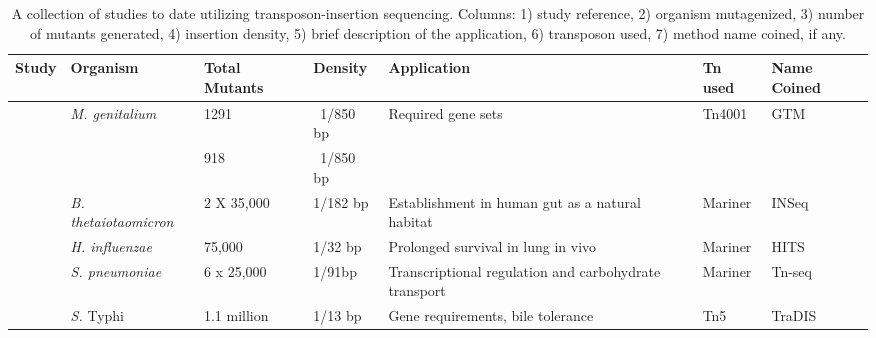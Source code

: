 %
\begingroup
\begin{landscape}
   \tiny
   \noindent
    \begin{longtable}{ l
    				l
				l
				l
				p{2in}
				l
				l}
    \caption[Summary of transposon-insertion sequencing studies to date]{A collection of studies to date utilizing transposon-insertion sequencing. Columns: 1) study reference,  2) organism mutagenized, 3) number of mutants generated, 4) insertion density, 5) brief description of the application, 6) transposon used, 7) method name coined, if any.}
    \\
    \toprule
    \textbf{Study} & \textbf{Organism} & \textbf{Total Mutants} & \textbf{Density} & \textbf{Application} & \textbf{Tn used } & \textbf{Name Coined} \\
    \midrule
    \multirow{2}[1]{*}{\textcite{Hutchison1999}}  & \multirow{2}[1]{*}{\textit{M. genitalium}} & 1291  &  ~1/850 bp & \multirow{2}[1]{2in}{Required gene sets} & \multirow{2}[1]{*}{Tn4001} & \multirow{2}[1]{*}{GTM\nomenclature{GTM}{Global transposon mutagenesis} } \\
          &  \textit{M. pneumoniae}     & 918   & ~1/850 bp &       &       &  \\
    \multirow{2}[0]{*}{\textcite{Goodman2009}} & \multirow{2}[0]{*}{\textit{B. thetaiotaomicron}} & \multirow{2}[0]{*}{2 X 35,000} & \multirow{2}[0]{*}{1/182 bp} & \multirow{2}[0]{2in}{Establishment in human gut as a natural habitat} & \multirow{2}[0]{*}{Mariner} & \multirow{2}[0]{*}{INSeq} \\
          &       &       &       &       &       &  \\
    \multirow{2}[0]{*}{\textcite{Gawronski2009} } & \multirow{2}[0]{*}{\textit{H. influenzae}} & \multirow{2}[0]{*}{75,000} & \multirow{2}[0]{*}{1/32 bp} & \multirow{2}[0]{2in}{Prolonged survival in lung in vivo} & \multirow{2}[0]{*}{Mariner} & \multirow{2}[0]{*}{ HITS} \\
          &       &       &       &       &       &  \\
   \textcite{Opijnen2009}  & \textit{S. pneumoniae} & 6 x 25,000 & 1/91bp & Transcriptional regulation and carbohydrate transport & Mariner & Tn-seq \\
    \multirow{2}[0]{*}{\textcite{Langridge2009a}}  & \multirow{2}[0]{*}{{\it S.} Typhi} & \multirow{2}[0]{*}{1.1 million} & 1/13 bp & \multirow{2}[0]{2in}{Gene requirements, bile tolerance} & \multirow{2}[0]{*}{Tn5} & \multirow{2}[0]{*}{TraDIS} \\

\end{longtable}
\end{landscape}
